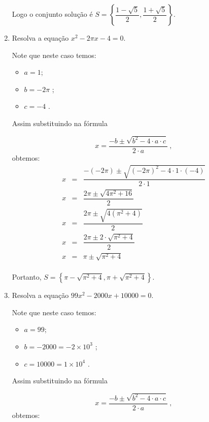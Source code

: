 \begin{exem}
\begin{enumerate}[1)]
 Logo o conjunto solução é $S= \left\{ \dfrac{1 - \sqrt{5}}{2}, \dfrac{1 + \sqrt{5}}{2} \right\}$.

  \item Resolva a equação $x^2 - 2 \pi x - 4= 0$.

 Note que neste caso temos:
  \begin{itemize}
  \item $a= 1$;
  \item $b= -2 \pi $ ;
  \item $c= -4$ .
  \end{itemize}
  Assim substituindo na fórmula

 \[x = \dfrac{-b \pm \sqrt{b^2 - 4 \cdot a \cdot c}}{2 \cdot a} \ ,\]
 obtemos:
 \begin{eqnarray*}
 x &=& \dfrac{-(-2\pi) \pm \sqrt{(-2\pi)^2 - 4 \cdot 1 \cdot (-4)}}{2 \cdot 1} \\
 x &=& \dfrac{ 2 \pi \pm \sqrt{ 4 \pi^2 + 16}}{2} \\
 x &=& \dfrac{ 2 \pi \pm \sqrt{ 4 (\pi^2 + 4)}}{2} \\
 x &=& \dfrac{ 2 \pi \pm 2 \cdot \sqrt{ \pi^2 + 4}}{2} \\
 x &=& \pi \pm \sqrt{\pi^2 + 4} \\
 \end{eqnarray*}

 Portanto, $S= \left\{ \pi - \sqrt{\pi^2 + 4}, \pi + \sqrt{\pi^2 + 4} \right\}$.

 \item Resolva a equação $99x^2 - 2000x + 10000= 0$.

 Note que neste caso temos:
  \begin{itemize}
  \item $a= 99$;
  \item $b= -2000= -2 \times 10^3$ ;
  \item $c= 10000= 1 \times 10^4$ .
  \end{itemize}
  Assim substituindo na fórmula

 \[x = \dfrac{-b \pm \sqrt{b^2 - 4 \cdot a \cdot c}}{2 \cdot a} \ ,\]
 obtemos:


\end{enumerate}
\end{exem}

